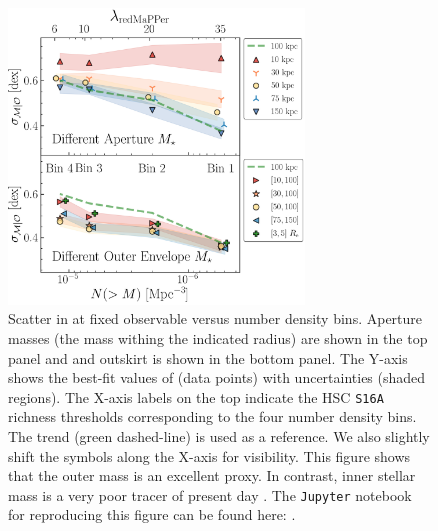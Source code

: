 \documentclass[fleqn,usenatbib,useAMS]{mnras}
\begin{document}
\begin{figure}
    \centering
    \includegraphics[width=0.7\textwidth]{figure/fig_5}
    \caption{
        Scatter in \mvir{} at fixed observable versus number density bins. Aperture masses (the mass
        withing the indicated radius) are shown in the top panel and and outskirt \mstar{} is shown
        in the bottom panel. 
        The Y-axis shows the best-fit values of \scatterMhaloObsSym{} (data points) with
        uncertainties (shaded regions). 
        The X-axis labels on the top indicate the HSC \texttt{S16A} \redm{} richness thresholds
        corresponding to the four number density bins. The  trend (green dashed-line) is
        used as a reference.
        We also slightly shift the symbols along the X-axis for visibility. 
        This figure shows that the outer mass is an excellent \mvir{} proxy.
        In contrast, inner stellar mass is a very poor tracer of present day \mvir{}.
        The \texttt{Jupyter} notebook for reproducing this figure can be found here:
        \href{https://github.com/dr-guangtou/jianbing/blob/master/notebooks/figure/fig5.ipynb}{\faGithub}.
    }
    \label{fig:scatter_trend}
\end{figure}

\end{document}
